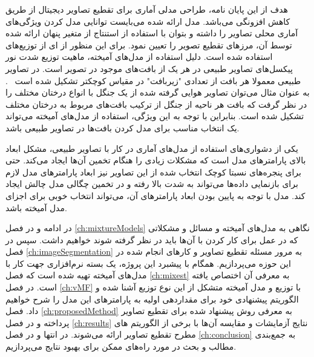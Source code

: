 هدف از این پایان نامه، طراحی مدلی آماری برای تقطیع تصاویر دیجیتال از طریق کاهش افزونگی می‌باشد.
مدل ارائه شده می‌بایست توانایی مدل کردن ویژگی‌های آماری محلی تصاویر را داشته و بتوان با استفاده از استنتاج از متغیر پنهان ارائه شده توسط آن، مرزهای تقطیع تصویر را تعیین نمود.
برای این منظور از
{}ای از توزیع‌های
استفاده شده است.
دلیل استفاده از مدل‌های آمیخته، ماهیت توزیع شدت نور پیکسل‌های تصاویر طبیعی در هر یک از بافت‌های موجود در تصویر است.
در تصاویر طبیعی معمولا هر بافت از تعدادی "زیربافت" در مقیاس کوچکتر تشکیل شده است%
~\cite{permuter_study_2006}.
به عنوان مثال می‌توان تصاویر هوایی گرفته شده از یک جنگل با انواع درختان مختلف را در نظر گرفت که بافت هر ناحیه از جنگل از ترکیب بافت‌های مربوط به درختان مختلف تشکیل شده است.
 بنابراین با توجه به این ویژگی، استفاده از مدل‌های آمیخته می‌تواند یک انتخاب مناسب برای مدل کردن بافت‌ها در تصاویر طبیعی باشد.

یکی از دشواری‌های استفاده از مدل‌های آماری در کار با تصاویر طبیعی، مشکل ابعاد بالای پارامترهای مدل است که مشکلات زیادی را هنگام تخمین آن‌ها ایجاد می‌کند.
حتی برای پنجره‌های نسبتا کوچک انتخاب شده از این تصاویر نیز ابعاد پارامترهای مدل لازم برای بازنمایی داده‌ها می‌تواند به شدت بالا رفته و در تخمین چگالی مدل چالش ایجاد کند.
مدل
با توجه به پایین بودن ابعاد پارامترهای آن، می‌تواند انتخاب خوبی برای اجزای مدل آمیخته باشد.


 در ادامه و در فصل
\ref{ch:mixtureModels}
نگاهی به مدل‌های آمیخته و مسائل و مشکلاتی که در عمل برای کار کردن با آن‌ها باید در نظر گرفته شوند خواهیم داشت.
سپس در فصل
\ref{ch:imageSegmentation}
به مرور مسئله تقطیع تصاویر و کارهای انجام شده در این حوزه می‌پردازیم.
همگام با پیشبرد این پروژه، یک بسته نرم‌افزاری جهت کار با مدل‌های آمیخته تهیه شده است که فصل
\ref{ch:mixest}
به معرفی آن اختصاص یافته است.
در فصل
\ref{ch:vMF}
با توزیع
و مدل آمیخته متشکل از این نوع توزیع آشنا شده و الگوریتم پیشنهادی خود برای مقداردهی اولیه به پارامترهای این مدل را شرح خواهیم داد.
فصل
\ref{ch:proposedMethod}
به معرفی روش پیشنهاد شده برای تقطیع تصاویر پرداخته و در فصل
\ref{ch:results}
نتایج آزمایشات و مقایسه آن‌ها با برخی از الگوریتم های مطرح تقطیع تصاویر ارائه می‌شوند.
در انتها و در فصل
\ref{ch:conclusion}
به جمع‌بندی مطالب و بحث در مورد راه‌های ممکن برای بهبود نتایج می‌پردازیم.







